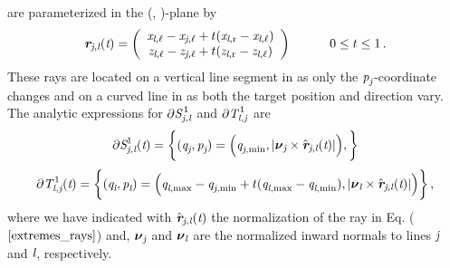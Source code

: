   are parameterized in the (, )-plane by
 \begin{equation}
\label{extremes_rays}
\textit{\textbf{r}}_{\textit{\textit{j}}, \textit{\textit{l}}}(\textit{t})=
\left( \begin{array}{cc}
\textit{x}_{\textit{\textit{l}}, \ell}-\textit{x}_{\textit{\textit{j}}, \ell}+t(\textit{x}_{\textit{\textit{l}}, \textrm{r}}-\textit{x}_{\textit{\textit{l}}, \ell}) \\
\textit{z}_{\textit{\textit{l}}, \ell}-\textit{z}_{\textit{\textit{j}}, \ell}+t(\textit{z}_{\textit{\textit{l}}, \textrm{r}}-\textit{z}_{\textit{\textit{l}},\ell})
\end{array} \right) \qquad \quad 0\leq t\leq 1\,.
\end{equation}
 These rays are located on a vertical line segment in  as only the $\mbox{\textit{p}}_{\textit{\textit{j}}}$-coordinate changes and on a curved line in 
  as both the target position and direction vary. The analytic expressions for $\partial \mbox{$\emph{S}_{\textit{\textit{j},\textit{l}}}^{\,1}$}$ and $\partial \mbox{$\emph{T}_{\textit{\textit{l},\textit{j}}}^{\,1}$}$ are
\begin{equation}
\label{S_boundary}
\partial \mbox{$\emph{S}_{\textit{\textit{j},\textit{l}}}^{1}$}(\textit{t})= \bigg\{ (\textit{q}_{\textit{\textit{j}}}, \textit{p}_{\textit{\textit{j}}}) = \Big(\textit{q}_{\textit{\textit{j}}, \textrm{min}},
|\boldsymbol{\nu}_{\textit{\textit{j}}}\times \hat{\textit{\textbf{r}}}_{\textit{\textit{j}}, \textit{\textit{l}}}(\textit{t})|
\Big), \bigg\}
\end{equation}
\begin{equation}
\label{T_boundary}
\partial\mbox{$\emph{T}_{\textit{\textit{l},\textit{j}}}^{\,1}$}(\textit{t})=\bigg\{(\textit{q}_{\textit{\textit{l}}}, \textit{p}_{\textit{\textit{l}}}) =
\Big(\textit{q}_{\textit{\textit{l}}, \textrm{max}}-\textit{q}_{\textit{\textit{j}}, \textrm{min}}+t(\textit{q}_{\textit{\textit{l}}, \textrm{max}}-\textit{q}_{\textit{\textit{l}},\textrm{min}}),
|\boldsymbol{\nu}_{\textit{\textit{l}}}\times \hat{\textit{\textbf{r}}}_{\textit{\textit{j}}, \textit{\textit{l}}}(\textit{t})|\Big) \bigg\}\,,
\end{equation}
where we have indicated with $\hat{\textit{\textbf{r}}}_{\textit{\textit{j}}, \textit{\textit{l}}}(\textit{t})$ the normalization of the ray in Eq. ($\ref{extremes_rays}$) and,
 $ \boldsymbol{\nu}_{\textit{\textit{j}}}$ and $\boldsymbol{\nu}_{\textit{\textit{l}}}$ are the normalized inward normals to lines $\textit{\textit{j}}$ and $\textit{\textit{l}}$, respectively.
